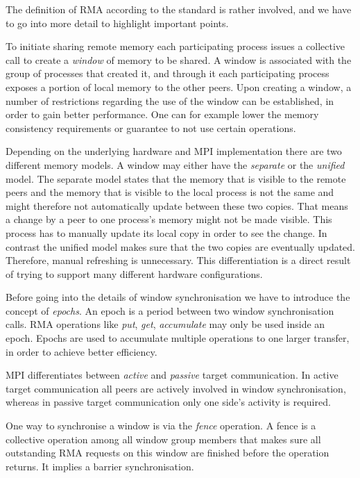 \documentclass[a4paper, 10pt]{article}
\begin{document}
The definition of RMA according to the standard is rather involved, and we have to go into more detail to highlight important points.

To initiate sharing remote memory each participating process issues a collective call to create a \emph{window} of memory to be shared. A window is associated with the group of processes that created it, and through it each participating process exposes a portion of local memory to the other peers.
Upon creating a window, a number of restrictions regarding the use of the window can be established, in order to gain better performance. One can for example lower the memory consistency requirements or guarantee to not use certain operations.

Depending on the underlying hardware and MPI implementation there are two different memory models. A window may either have the \emph{separate} or the \emph{unified} model. The separate model states that the memory that is visible to the remote peers and the memory that is visible to the local process is not the same and might therefore not automatically update between these two copies. That means a change by a peer to one process's memory might not be made visible. This process has to manually update its local copy in order to see the change. In contrast the unified model makes sure that the two copies are eventually updated. Therefore, manual refreshing is unnecessary. This differentiation is a direct result of trying to support many different hardware configurations.

Before going into the details of window synchronisation we have to introduce the concept of \emph{epochs}. An epoch is a period between two window synchronisation calls. RMA operations like \emph{put}, \emph{get}, \emph{accumulate} may only be used inside an epoch. Epochs are used to accumulate multiple operations to one larger transfer, in order to achieve better efficiency.

MPI differentiates between \emph{active} and \emph{passive} target communication. In active target communication all peers are actively involved in window synchronisation, whereas in passive target communication only one side's activity is required.

One way to synchronise a window is via the \emph{fence} operation. A fence is a collective operation among all window group members that makes sure all outstanding RMA requests on this window are finished before the operation returns. It implies a barrier synchronisation.
\end{document}
